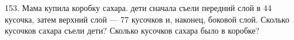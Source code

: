 153. Мама купила коробку сахара. дети сначала съели передний слой в 44 кусочка, затем верхний слой --- 77 кусочков и, наконец, боковой слой. Сколько кусочков сахара съели дети? Сколько кусочков сахара было в коробке?\\
